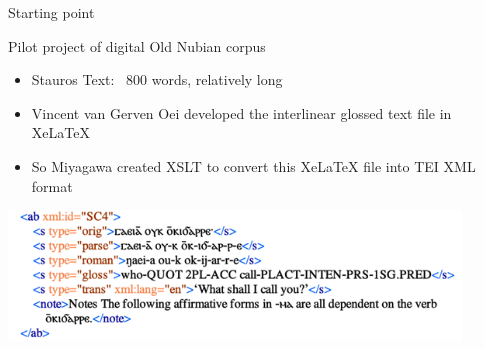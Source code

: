 \documentclass{beamer}
\begin{document}
\begin{frame}{Starting point}
  \begin{block}{Pilot project of digital Old Nubian corpus}
    \begin{itemize}
      \item Stauros Text:  ~800 words, relatively long
      \item Vincent van Gerven Oei developed the interlinear glossed text file in XeLaTeX
      \item So Miyagawa created XSLT to convert this XeLaTeX file into TEI XML format
   \end{itemize}
  \end{block}
  \begin{center}

\end{center}
  \includegraphics[width=0.9\textwidth]{tei.png}
\end{frame}
\end{document}
